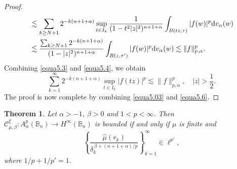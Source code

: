 \documentclass[preprint,12pt,times]{elsarticle}
\newtheorem{theorem}{Theorem}[section]
\theoremstyle{definition}
\theoremstyle{remark}
\numberwithin{equation}{section}
\begin{document}
\begin{proof}
\begin{equation}
\begin{split}
&\lesssim \sum_{k\geq N+1}2^{-k(n+1+\alpha)}\sup_{t\in I_k}\frac{1}{(1-t^2 |z|^2)^{n+1+\alpha}}\int_{B(tz,\tau)}|f(w)|^p{\rm d}v_{\alpha}(w)\\
&\lesssim \frac{\sum_{k\geq N+1}2^{-k(n+1+\alpha)}}{(1-|z|^2)^{n+1+\alpha}}\int_{B(z,\tau')}|f(w)|^p{\rm d}v_{\alpha}(w)\lesssim \|f\|_{p,\alpha}^p.
\end{split}
\end{equation}
Combining \eqref{equa5.3} and \eqref{equa5.4}, we obtain
\begin{equation}\label{equa5.6}
\sum_{k=1}^{\infty}2^{-k(n+1+\alpha)}\sup_{t\in I_k}|f(tz)|^p\lesssim \|f\|_{p,\alpha}^p,\quad |z|>\frac{1}{2}.
\end{equation}
The proof is now complete by combining \eqref{equa5.03} and \eqref{equa5.6}.
\end{proof}

\begin{theorem}\label{theorem5.4}
Let $\alpha>-1$, $\beta>0$ and $1<p<\infty$.  Then $\mathcal{C}_{\mu,\beta}^{\xi}: A_{\alpha}^p(\mathbb{B}_n)\to H^{\infty}(\mathbb{B}_n)$ is bounded if and only if $\mu$ is finite and 
\begin{equation}\label{equa5.7}
    \left\{\frac{\hat{\mu}(r_k)}{\delta_k^{\,\beta+(n+1+\alpha)/p}}\right\}_{k=1}^{\infty}\in \ell^{p'},
\end{equation}
where $1/p+1/p'=1$.
\end{theorem}
\end{document}
